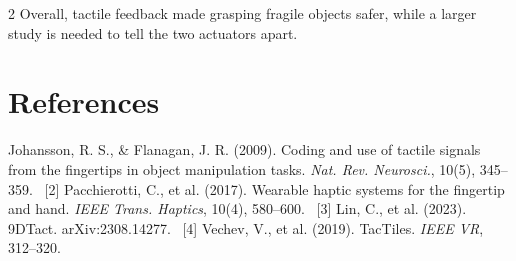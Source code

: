 \documentclass[a4paper, 12pt]{article}
\begin{document}
\begin{multicols}{2}
  Overall, tactile feedback made grasping fragile objects safer, while a larger study is
  needed to tell the two actuators apart.

  \section{References}

  \begin{scriptsize}
    [1] Johansson, R. S., \& Flanagan, J. R. (2009).
    Coding and use of tactile signals from the fingertips in object
    manipulation tasks. \textit{Nat. Rev. Neurosci.}, 10(5), 345--359.
    \ [2] Pacchierotti, C., et al. (2017). Wearable haptic systems
    for the fingertip and hand. \textit{IEEE Trans. Haptics}, 10(4),
    580--600. \ [3] Lin, C., et al. (2023). 9DTact. arXiv:2308.14277.
    \ [4] Vechev, V., et al. (2019). TacTiles. \textit{IEEE VR}, 312--320.

  \end{scriptsize}

\end{multicols}
\end{document}
